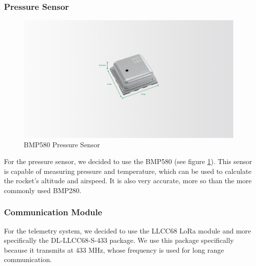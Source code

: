 \documentclass{article}
\begin{document}
\subsubsection*{Pressure Sensor}
\begin{figure}[p]
      \caption{BMP580 Pressure Sensor\cite{BMP580}}
      \label{fig:bmp580}
      \centering
      \includegraphics[width=\textwidth]{bmp580.jpg}
\end{figure}
For the pressure sensor, we decided to use the BMP580 (see figure \ref{fig:bmp580}). This sensor is capable of measuring pressure and temperature, which can be used to calculate the rocket's altitude and airspeed. It is also very accurate, more so than the more commonly used BMP280. \cite{Bosch_Sensortec_2024}

\subsubsection{Communication Module}
For the telemetry system, we decided to use the LLCC68 LoRa module and more specifically the DL-LLCC68-S-433 package. We use this package specifically because it transmits at 433 MHz, whose frequency is used for long range communication.
\end{document}
